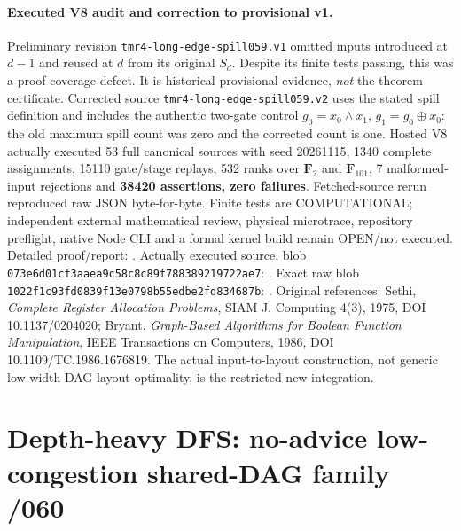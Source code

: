 \documentclass[11pt]{article}
\begin{document}
\paragraph{Executed V8 audit and correction to provisional v1.}
Preliminary revision \texttt{tmr4-long-edge-spill059.v1} omitted inputs
introduced at $d-1$ and reused at $d$ from its original $S_d$.
Despite its finite tests passing, this was a proof-coverage defect.
It is historical provisional evidence, \emph{not} the theorem certificate.
Corrected source \texttt{tmr4-long-edge-spill059.v2} uses the stated
spill definition and includes the authentic two-gate control
$g_0=x_0\wedge x_1$,
$g_1=g_0\oplus x_0$: the old maximum spill count was zero and the
corrected count is one. Hosted V8 actually executed 53 full canonical
sources with seed 20261115, 1340 complete assignments,
15110 gate/stage replays, 532 ranks over $\mathbf F_2$ and
$\mathbf F_{101}$, 7 malformed-input rejections and
\textbf{38420 assertions, zero failures}.
Fetched-source rerun reproduced raw JSON byte-for-byte.
Finite tests are COMPUTATIONAL; independent external mathematical
review, physical microtrace, repository preflight, native Node CLI
and a formal kernel build remain OPEN/not executed.
Detailed proof/report:
.
Actually executed source, blob \texttt{073e6d01cf3aaea9c58c8c89f788389219722ae7}:
.
Exact raw blob \texttt{1022f1c93fd0839f13e0798b55edbe2fd834687b}:
.
Original references: Sethi, \emph{Complete Register Allocation Problems},
SIAM J. Computing 4(3), 1975, DOI 10.1137/0204020;
Bryant, \emph{Graph-Based Algorithms for Boolean Function Manipulation},
IEEE Transactions on Computers, 1986,
DOI 10.1109/TC.1986.1676819.
The actual input-to-layout construction, not generic low-width
DAG layout optimality, is the restricted new integration.


\section{Depth-heavy DFS: no-advice low-congestion shared-DAG family /060}
\end{document}

